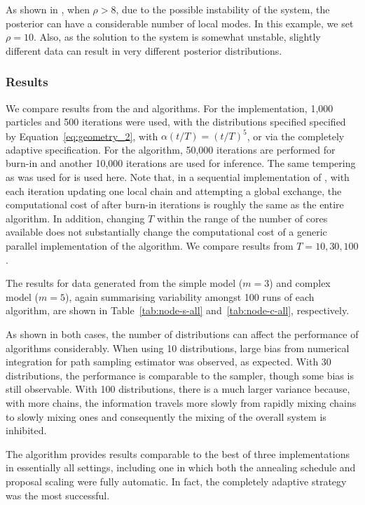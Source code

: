 As shown in \cite{Calderhead:2009bd}, when $\rho > 8$, due to the possible
instability of the \ode system, the posterior can have a considerable number
of local modes. In this example, we set $\rho = 10$. Also, as the solution to
the \ode system is somewhat unstable, slightly different data can result in
very different posterior distributions.

\subsubsection{Results}

We compare results from the \smc[2] and \pmcmc algorithms. For the \smc
implementation, 1,000 particles and 500 iterations were used, with the
distributions specified specified by Equation~\eqref{eq:geometry_2}, with
$\alpha(t/T) = (t/T)^5$, or via the completely adaptive specification. For
the \pmcmc algorithm, 50,000 iterations are performed for burn-in and another
10,000 iterations are used for inference. The same tempering as was used for
\smc is used here. Note that, in a sequential implementation of \pmcmc, with
each iteration updating one local chain and attempting a global exchange, the
computational cost of after burn-in iterations is roughly the same as the
entire \smc algorithm. In addition, changing $T$ within the range of the
number of cores available does not substantially change the computational cost
of a generic parallel implementation of the \pmcmc algorithm. We compare
results from $T = 10,30,100$.

The results for data generated from the simple model ($m = 3$) and complex
model ($m = 5$), again summarising variability amongst 100 runs of each
algorithm, are shown in Table~\ref{tab:node-s-all} and~\ref{tab:node-c-all},
respectively.




As shown in both cases, the number of distributions can affect the performance
of \pmcmc algorithms considerably. When using 10 distributions, large bias
from numerical integration for path sampling estimator was observed, as
expected. With 30 distributions, the performance is comparable to the \smc[2]
sampler, though some bias is still observable. With 100 distributions, there
is a much larger variance because, with more chains, the information travels
more slowly from rapidly mixing chains to slowly mixing ones and consequently
the mixing of the overall system is inhibited.

The \smc algorithm provides results comparable to the best of
three \pmcmc implementations in essentially all settings, including one in
which both the annealing schedule and proposal scaling were fully
automatic. In fact, the completely adaptive strategy was the most successful.

